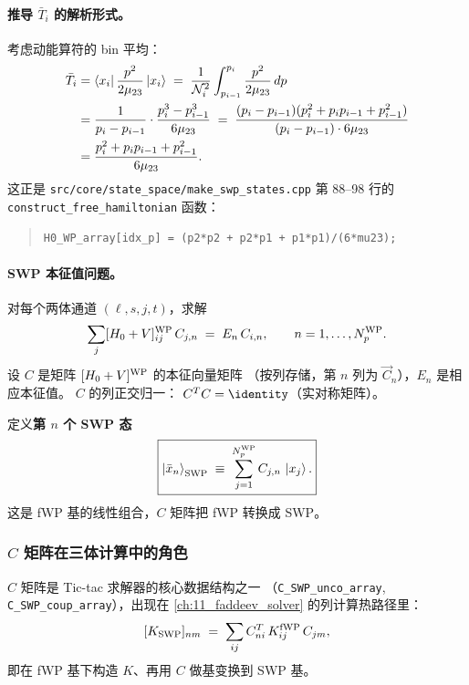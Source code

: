 \paragraph{推导 \(\bar{T}_i\) 的解析形式。}
考虑动能算符的 bin 平均：
\begin{align}
\bar{T}_i
&= \bra{x_i}\frac{p^2}{2\mu_{23}}\ket{x_{i}}
 \;=\; \frac{1}{\mathcal{N}_i^2}\int_{p_{i-1}}^{p_i} \frac{p^2}{2\mu_{23}}\,dp
 \nonumber\\
&= \frac{1}{p_i - p_{i-1}}\cdot \frac{p_i^3 - p_{i-1}^3}{6\mu_{23}}
 \;=\; \frac{(p_i - p_{i-1})(p_i^2 + p_i p_{i-1} + p_{i-1}^2)}{(p_i - p_{i-1}) \cdot 6\mu_{23}}
 \nonumber\\
&= \frac{p_i^2 + p_i p_{i-1} + p_{i-1}^2}{6\mu_{23}}.
\label{eq:ch05-Tbar-derivation}
\end{align}
这正是 \texttt{src/core/state\_space/make\_swp\_states.cpp} 第 88--98 行的
\texttt{construct\_free\_hamiltonian} 函数：
\begin{quote}
\texttt{H0\_WP\_array[idx\_p] = (p2*p2 + p2*p1 + p1*p1)/(6*mu23);}
\end{quote}

\paragraph{SWP 本征值问题。}
对每个两体通道 \((\ell, s, j, t)\)，求解
\begin{equation}
\label{eq:ch05-SWP-eigenproblem}
\sum_j [H_0 + V]^{\rm WP}_{ij}\,C_{j,n}
\;=\;
E_n\,C_{i,n},
\qquad n = 1, \ldots, {N_{p}^{\text{WP}}}.
\end{equation}
设 \(C\) 是矩阵 \([H_0 + V]^{\rm WP}\) 的本征向量矩阵
（按列存储，第 \(n\) 列为 \(\vec{C}_n\)），\(E_n\) 是相应本征值。
\(C\) 的列正交归一：
\(C^T C = \identity\)（实对称矩阵）。

定义\textbf{第 \(n\) 个 SWP 态}
\begin{equation}
\label{eq:ch05-SWP-def-state}
\boxed{
\ket{\bar{x}_n}_{\rm SWP}
\;\equiv\;
\sum_{j=1}^{{N_{p}^{\text{WP}}}} C_{j,n}\,\ket{x_{j}}.
}
\end{equation}
这是 fWP 基的线性组合，\(C\) 矩阵把 fWP 转换成 SWP。

\subsubsection*{\(C\) 矩阵在三体计算中的角色}

\(C\) 矩阵是 Tic-tac 求解器的核心数据结构之一
（\texttt{C\_SWP\_unco\_array}, \texttt{C\_SWP\_coup\_array}），出现在
\cref{ch:11_faddeev_solver} 的列计算热路径里：
\begin{equation}
\label{eq:ch05-CTKVC}
[K_{\rm SWP}]_{nm} \;=\; \sum_{ij} C^T_{ni}\,K_{ij}^{\rm fWP}\,C_{jm},
\end{equation}
即在 fWP 基下构造 \(K\)、再用 \(C\) 做基变换到 SWP 基。

